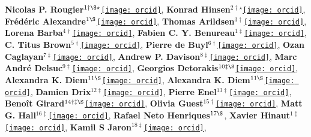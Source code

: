 \textbf{Nicolas P. Rougier}$^{1\dagger\S\star}$\href{http://orcid.org/0000-0002-6972-589X}{\texttt{[image: orcid]}},
\textbf{Konrad Hinsen}$^{2\dagger\star}$\href{http://orcid.org/0000-0003-0330-9428}{\texttt{[image: orcid]}},
\textbf{Frédéric Alexandre}$^{1\S}$\href{http://orcid.org/0000-0002-6113-1878}{\texttt{[image: orcid]}},
\textbf{Thomas Arildsen}$^{3\dagger}$\href{http://orcid.org/0000-0003-3254-3790}{\texttt{[image: orcid]}},
\textbf{Lorena Barba}$^{4\dagger}$\href{http://orcid.org/0000-0001-5812-2711}{\texttt{[image: orcid]}},
\textbf{Fabien C. Y. Benureau}$^{1\ddagger}$\href{http://orcid.org/0000-0003-4083-4512}{\texttt{[image: orcid]}},
\textbf{C. Titus Brown}$^{5\dagger}$\href{http://orcid.org/0000-0001-6001-2677}{\texttt{[image: orcid]}},
\textbf{Pierre de Buyl}$^{6\dagger}$\href{http://orcid.org/0000-0002-6640-6463}{\texttt{[image: orcid]}},
\textbf{Ozan Caglayan}$^{7\ddagger}$\href{http://orcid.org/0000-0002-5992-3470}{\texttt{[image: orcid]}},
\textbf{Andrew P. Davison}$^{8\ddagger}$\href{http://orcid.org/0000-0002-4793-7541}{\texttt{[image: orcid]}},
\textbf{Marc André Delsuc}$^{9\ddagger}$\href{http://orcid.org/0000-0002-1400-5326}{\texttt{[image: orcid]}},
\textbf{Georgios Detorakis}$^{10\ddagger\S}$\href{http://orcid.org/0000-0001-5891-1702}{\texttt{[image: orcid]}},
\textbf{Alexandra K. Diem}$^{11\S}$\href{http://orcid.org/0000-0003-1719-1942}{\texttt{[image: orcid]}},
\textbf{Alexandra K. Diem}$^{11\S}$\href{http://orcid.org/0000-0003-1719-1942}{\texttt{[image: orcid]}},
\textbf{Damien Drix}$^{12\ddagger}$\href{http://orcid.org/0000-0003-4107-5693}{\texttt{[image: orcid]}},
\textbf{Pierre Enel}$^{13\ddagger}$\href{http://orcid.org/0000-0001-8983-6223}{\texttt{[image: orcid]}},
\textbf{Benoît Girard}$^{14\dagger\ddagger\S}$\href{http://orcid.org/0000-0002-8117-7064}{\texttt{[image: orcid]}},
\textbf{Olivia Guest}$^{15\dagger}$\href{http://orcid.org/0000-0002-1891-0972}{\texttt{[image: orcid]}},
\textbf{Matt G. Hall}$^{16\ddagger}$\href{http://orcid.org/0000-0002-9530-5477}{\texttt{[image: orcid]}},
\textbf{Rafael Neto Henriques}$^{17\S}$,
\textbf{Xavier Hinaut}$^{1\ddagger}$\href{http://orcid.org/0000-0002-1924-1184}{\texttt{[image: orcid]}},
\textbf{Kamil S Jaron}$^{18\ddagger}$\href{http://orcid.org/0000-0003-1470-5450}{\texttt{[image: orcid]}},
